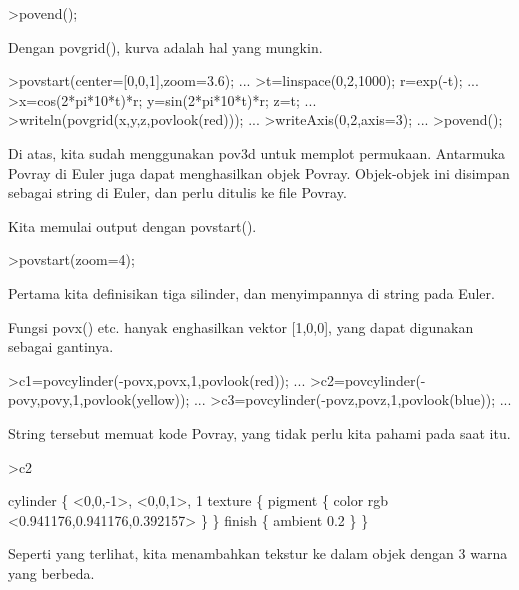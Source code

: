 \documentclass{article}
\begin{document}
\begin{eulernotebook}
\begin{eulerprompt}
>povend();
\end{eulerprompt}
\begin{eulercomment}
Dengan povgrid(), kurva adalah hal yang mungkin.
\end{eulercomment}
\begin{eulerprompt}
>povstart(center=[0,0,1],zoom=3.6); ...
>t=linspace(0,2,1000); r=exp(-t); ...
>x=cos(2*pi*10*t)*r; y=sin(2*pi*10*t)*r; z=t; ...
>writeln(povgrid(x,y,z,povlook(red))); ...
>writeAxis(0,2,axis=3); ...
>povend();
\end{eulerprompt}
\begin{eulercomment}
Di atas, kita sudah menggunakan pov3d untuk memplot permukaan.
Antarmuka Povray di Euler juga dapat menghasilkan objek Povray.
Objek-objek ini disimpan sebagai string di Euler, dan perlu ditulis ke
file Povray.

Kita memulai output dengan povstart().
\end{eulercomment}
\begin{eulerprompt}
>povstart(zoom=4);
\end{eulerprompt}
\begin{eulercomment}
Pertama kita definisikan tiga silinder, dan menyimpannya di string
pada Euler.

Fungsi povx() etc. hanyak enghasilkan vektor [1,0,0], yang dapat
digunakan sebagai gantinya.
\end{eulercomment}
\begin{eulerprompt}
>c1=povcylinder(-povx,povx,1,povlook(red)); ...
>c2=povcylinder(-povy,povy,1,povlook(yellow)); ...
>c3=povcylinder(-povz,povz,1,povlook(blue)); ...
\end{eulerprompt}
\begin{eulercomment}
String tersebut memuat kode Povray, yang tidak perlu kita pahami pada
saat itu.
\end{eulercomment}
\begin{eulerprompt}
>c2
\end{eulerprompt}
\begin{euleroutput}
  cylinder \{ <0,0,-1>, <0,0,1>, 1
   texture \{ pigment \{ color rgb <0.941176,0.941176,0.392157> \}  \} 
   finish \{ ambient 0.2 \} 
   \}
\end{euleroutput}
\begin{eulercomment}
Seperti yang terlihat, kita menambahkan tekstur ke dalam objek dengan
3 warna yang berbeda.


\end{eulercomment}
\end{eulernotebook}
\end{document}
